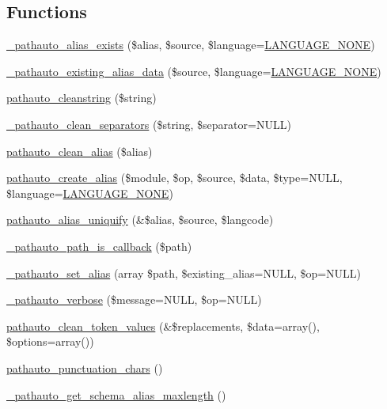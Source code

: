 \subsection*{Functions}
\begin{DoxyCompactItemize}
\item 
\hyperlink{pathauto_8inc_add7c5186fb921739f6cccd5cf2a2c82a}{\_\-pathauto\_\-alias\_\-exists} (\$alias, \$source, \$language=\hyperlink{bootstrap_8inc_a9e91e2136aa0ce5c5e80f06aa3ad8266}{LANGUAGE\_\-NONE})
\item 
\hyperlink{pathauto_8inc_a4b36d2f45da703ece553f0d39f26d2b8}{\_\-pathauto\_\-existing\_\-alias\_\-data} (\$source, \$language=\hyperlink{bootstrap_8inc_a9e91e2136aa0ce5c5e80f06aa3ad8266}{LANGUAGE\_\-NONE})
\item 
\hyperlink{pathauto_8inc_a0087774598dbc1a71658867d2275a3d1}{pathauto\_\-cleanstring} (\$string)
\item 
\hyperlink{pathauto_8inc_a84df3a794eb1448559c84aae690b4eb3}{\_\-pathauto\_\-clean\_\-separators} (\$string, \$separator=NULL)
\item 
\hyperlink{pathauto_8inc_a4a29b9c383bf47bb94f57e1602f847d9}{pathauto\_\-clean\_\-alias} (\$alias)
\item 
\hyperlink{pathauto_8inc_a7b68bec532634de11616779796a1fb7f}{pathauto\_\-create\_\-alias} (\$module, \$op, \$source, \$data, \$type=NULL, \$language=\hyperlink{bootstrap_8inc_a9e91e2136aa0ce5c5e80f06aa3ad8266}{LANGUAGE\_\-NONE})
\item 
\hyperlink{pathauto_8inc_a997f76101702f48dd85c852ca2e91c3b}{pathauto\_\-alias\_\-uniquify} (\&\$alias, \$source, \$langcode)
\item 
\hyperlink{pathauto_8inc_a37f91c1fb2698d7280300505d2dcd55e}{\_\-pathauto\_\-path\_\-is\_\-callback} (\$path)
\item 
\hyperlink{pathauto_8inc_a954e5a5c442176c91e5a8fead004f9f1}{\_\-pathauto\_\-set\_\-alias} (array \$path, \$existing\_\-alias=NULL, \$op=NULL)
\item 
\hyperlink{pathauto_8inc_af1d110e621b254e3b2c925c824dd890a}{\_\-pathauto\_\-verbose} (\$message=NULL, \$op=NULL)
\item 
\hyperlink{pathauto_8inc_ab835bd3414c289c7a0a2fcbf38d6f13d}{pathauto\_\-clean\_\-token\_\-values} (\&\$replacements, \$data=array(), \$options=array())
\item 
\hyperlink{pathauto_8inc_a939a77c5a4177051307d62aad585b74e}{pathauto\_\-punctuation\_\-chars} ()
\item 
\hyperlink{pathauto_8inc_a9f709612633603049fcbd0c2f9b1ef09}{\_\-pathauto\_\-get\_\-schema\_\-alias\_\-maxlength} ()
\end{DoxyCompactItemize}


